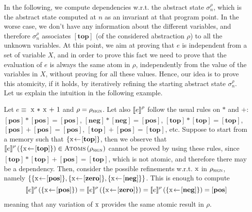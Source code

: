 \documentclass[prodmode,acmtocl]{acmsmall}
\newcommand{\BIND}[2]{#1\!\leftarrow\!#2}
\def\uco{\ensuremath{\rho}\xspace}
\newcommand{\astatei}[1]{{\sigma^\rho_{#1}}\xspace}
\def\ok#1{\mbox{\raisebox{0ex}[1ex][1ex]{$#1$}}}
\newcommand{\0}{\mbox{\bf 0}}
\def\ok#1{\mbox{\raisebox{0ex}[1ex][1ex]{$#1$}}}
\newcommand{\UNARYFUNCTION}[2]{#1\ifthenelse{\equal{#2}{}}{}{\left(#2\right)}}
\newcommand{\CODE}[1]{\ensuremath{\mbox{\lstinline!#1!}\xspace}\xspace}
\def\xx{\CODE{x}}
\newcommand{\SEMANTICS}[1]{\left\llbracket #1 \right\rrbracket}
\def\exp{e}
\def\TOP{\ABSVAL{top}}
\def\SIGNDOM{\ensuremath{\uco_{\textsc{sign}}}\xspace}
\def\POS{\ABSVAL{pos}}
\def\NEG{\ABSVAL{neg}}
\def\ZERO{\ABSVAL{zero}}
\newcommand{\ABSVAL}[1]{\left[\mathbf{#1}\right]}
\newcommand{\ABSEVAL}[2]{\ok{\UNARYFUNCTION{\SEMANTICS{#1}^\rho}{#2}}}
\newcommand{\ATOMS}[1]{\UNARYFUNCTION{\textsc{Atoms}}{#1}}
\begin{document}
In the following, we compute dependencies w.r.t. the abstract state
$\astatei{n}$, which is the abstract state computed at $n$ as an
invariant at that program point. In the worse case, we don't have any
information about the different variables, and therefore $\astatei{n}$
associates $\TOP$ (of the considered abstraction $\uco$) to all the
unknown variables.  At this point, we aim at proving that $\exp$ is
independent from a set of variable $X$, and in order to prove this
fact we need to prove that the evaluation of $\exp$ is always the same
atom in $\uco$, independently from the value of the variables in $X$,
without proving for all these values. Hence, our idea is to prove this
atomicity, if it holds, by iteratively refining the starting abstract
state $\astatei{n}$. Let us explain the intuition in the following
example.

\begin{example}
  \label{example:funesharppMeaning}
  Let $\exp \equiv$ \CODE{x * x + 1} and $\uco = \SIGNDOM$.  
  Let also
  $\ABSEVAL{\exp}{}$ follow the usual rules on $*$ and $+$: $\POS * \POS
  = \POS$, $\NEG * \NEG = \POS$, $\TOP * \TOP = \TOP$, $\POS + \POS =
  \POS$, $\TOP + \POS = \TOP$, etc.  Suppose to start from a memory such that $\{\BIND{\xx}{\TOP}\}$, then we observe that 
  $\ABSEVAL{\exp}{\{\BIND{\xx}{\TOP}\}} \in\ATOMS{\SIGNDOM}$ cannot be proved by using these
  rules, since $\TOP * \TOP + \POS = \TOP$, which is not atomic, and therefore there may be a dependency. Then, consider the possible refinements w.r.t. \xx in $\SIGNDOM$, namely 
  $\{\{\BIND{\xx}{\POS}\},\{\BIND{\xx}{\ZERO}\},\{\BIND{\xx}{\NEG}\}\}$. 
  This is enough to compute
  \[ \ABSEVAL{\exp}{\{\BIND{\xx}{\POS}\}} = \ABSEVAL{\exp}{\{\BIND{\xx}{\ZERO}\}} =
  \ABSEVAL{\exp}{\{\BIND{\xx}{\NEG}\}} = \POS\] meaning that any
  variation of \xx provides the same atomic result in $\uco$.
\end{example}
\end{document}
